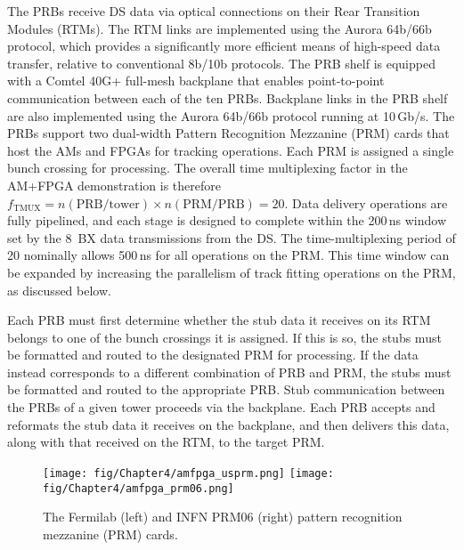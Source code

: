 The PRBs receive DS data via optical connections on their Rear Transition Modules (RTMs). The RTM links are implemented using the Aurora 64b/66b protocol, which provides a significantly more efficient means of high-speed data transfer, relative to conventional 8b/10b protocols. The PRB shelf is equipped with a Comtel 40G+ full-mesh backplane that enables point-to-point communication between each of the ten PRBs. Backplane links in the PRB shelf are also implemented using the Aurora 64b/66b protocol running at 10\,Gb/s. The PRBs support two dual-width Pattern Recognition Mezzanine (PRM) cards that host the AMs and \mbox{FPGAs} for tracking operations. Each PRM is assigned a single bunch crossing for processing. The overall time multiplexing factor in the AM+FPGA demonstration is therefore $f_{\text{TMUX}} = n(\text{PRB}/\text{tower}) \times n(\text{PRM}/\text{PRB}) = 20$. Data delivery operations are fully pipelined, and each stage is designed to complete within the 200\,ns window set by the 8~BX data transmissions from the DS. The time-multiplexing period of 20 nominally allows 500\,ns for all operations on the PRM. This time window can be expanded by increasing the parallelism of track fitting operations on the PRM, as discussed below.

Each PRB must first determine whether the stub data it receives on its RTM belongs to one of the bunch crossings it is assigned. If this is so, the stubs must be formatted and routed to the designated PRM for processing. If the data instead corresponds to a different combination of PRB and PRM, the stubs must be formatted and routed to the appropriate PRB. Stub communication between the PRBs of a given tower proceeds via the backplane. Each PRB accepts and reformats the stub data it receives on the backplane, and then delivers this data, along with that received on the RTM, to the target PRM.  

\begin{figure}[t]
  \centering
\texttt{[image: fig/Chapter4/amfpga\_usprm.png]}\label{fig:amfpga_usprm}
\hfill
\texttt{[image: fig/Chapter4/amfpga\_prm06.png]}\label{fig:amfpga_prm06}
  \caption{The Fermilab (left) and INFN PRM06 (right) pattern recognition mezzanine (PRM) cards.} 
  \label{fig:amfpga_prms}
\end{figure}

